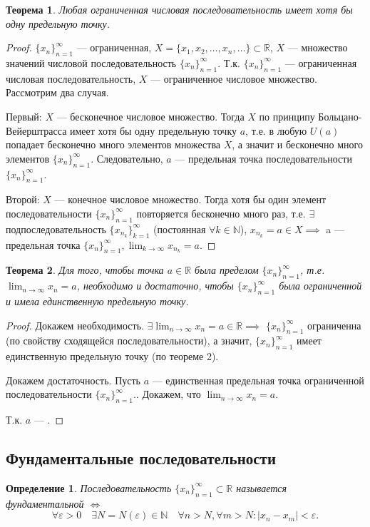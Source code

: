 \documentclass[a4paper,12pt]{article} %
\newtheorem{definition}{Определение}[subsection]
\newtheorem{theorem}{Теорема}[subsection]
\theoremstyle{remark}
\begin{document}
\begin{theorem}
	Любая ограниченная числовая последовательность имеет хотя бы одну предельную точку.
\end{theorem}
\begin{proof}
	$\{x_n\}_{n=1}^{\infty}$ --- ограниченная, $X = \{x_1, x_2, \ldots, x_n, \ldots\} \subset \mathbb{R}$, $X$ --- множество значений числовой последовательность $\{x_n\}_{n=1}^{\infty}$. Т.к. $\{x_n\}_{n=1}^{\infty}$ --- ограниченная числовая последовательность, $X$ --- ограниченное числовое множество.
	Рассмотрим два случая.

	Первый: $X$ --- бесконечное числовое множество. Тогда $X$ по принципу Больцано-Вейерштрасса имеет хотя бы одну предельную точку $a$, т.е. в любую $U(a)$ попадает бесконечно много элементов множества $X$, а значит и бесконечно много элементов $\{x_n\}_{n=1}^{\infty}$. Следовательно, $a$ --- предельная точка последовательности $\{x_n\}_{n=1}^{\infty}$.

	Второй: $X$ --- конечное числовое множество. Тогда хотя бы один элемент последовательности $\{x_n\}_{n=1}^{\infty}$ повторяется бесконечно много раз, т.е. $\exists$ подпоследовательность $\{x_{n_k}\}_{k=1}^{\infty}$ (постоянная $\forall k\in \mathbb{N}$), $x_{n_k} = a\in  X \implies$ a --- предельная точка $\{x_n\}_{n=1}^{\infty}, \lim_{k \to \infty} x_{n_k} = a$.
\end{proof}

\begin{theorem}
	Для того, чтобы точка $a\in \mathbb{R}$ была пределом $\{x_n\}_{n=1}^{\infty}$, т.е. $\lim_{n \to \infty} x_n = a$, необходимо и достаточно, чтобы $\{x_n\}_{n=1}^{\infty}$ была ограниченной и имела единственную предельную точку.
\end{theorem}
\begin{proof}
	Докажем необходимость.
	$\exists \lim_{n \to \infty} x_n = a \in \mathbb{R} \implies$ $\{x_n\}_{n=1}^{\infty}$ ограниченна (по свойству сходящейся последовательности), а значит, $\{x_n\}_{n=1}^{\infty}$ имеет единственную предельную точку (по теореме 2).

	Докажем достаточность. Пусть $a$ --- единственная предельная точка ограниченной последовательности $\{x_n\}_{n=1}^{\infty}.$. Докажем, что $\lim_{n \to \infty} x_n = a$.

	Т.к. $a$ --- .
\end{proof}



\subsection{Фундаментальные последовательности}
\begin{definition}
	Последовательность $\{x_n\}_{n=1}^{\infty} \subset  \mathbb{R}$ называется фундаментальной $\iff $
	\[
	\forall \varepsilon>0 \quad \exists N=N(\varepsilon) \in  \mathbb{N} \quad \forall n>N, \forall m>N : |x_n-x_m|<\varepsilon
	.\] 
\end{definition}
\end{document}

